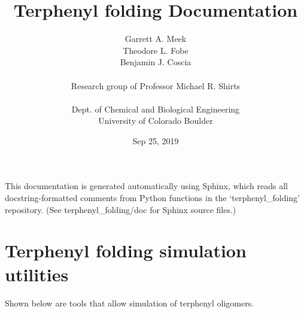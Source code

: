 \documentclass[letterpaper,12pt,english,openany,oneside]{sphinxmanual}
\title{Terphenyl folding Documentation}
\date{Sep 25, 2019}
\author{Garrett A. Meek\\Theodore L. Fobe\\Benjamin J. Coscia\\ \\Research group of Professor Michael R. Shirts\\ \\Dept. of Chemical and Biological Engineering\\University of Colorado Boulder}
\begin{document}
\pagestyle{empty}
\sphinxmaketitle
\pagestyle{plain}
\sphinxtableofcontents
\pagestyle{normal}
\label{\detokenize{index::doc}}


This documentation is generated automatically using Sphinx, which reads all docstring-formatted comments from Python functions in the ‘terphenyl\_folding’ repository.  (See terphenyl\_folding/doc for Sphinx source files.)


\chapter{Terphenyl folding simulation utilities}
\label{\detokenize{simulation:terphenyl-folding-simulation-utilities}}\label{\detokenize{simulation::doc}}
Shown below are tools that allow simulation of terphenyl oligomers.

\label{\detokenize{simulation:module-simulation}}

\begin{fulllineitems}
\label{\detokenize{simulation:simulation.adjust_solvent_density}}
\end{fulllineitems}

\end{document}

